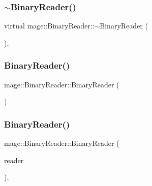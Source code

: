 \subsubsection{\texorpdfstring{$\sim$\+Binary\+Reader()}{~BinaryReader()}}
{\footnotesize\ttfamily virtual mage\+::\+Binary\+Reader\+::$\sim$\+Binary\+Reader (\begin{DoxyParamCaption}{ }\end{DoxyParamCaption})\hspace{0.3cm}{\ttfamily [virtual]}, {\ttfamily [default]}}

\hypertarget{classmage_1_1_binary_reader_aab82579cef4f2f022273cf1adfcc8497}{}\label{classmage_1_1_binary_reader_aab82579cef4f2f022273cf1adfcc8497} 
\subsubsection{\texorpdfstring{Binary\+Reader()}{BinaryReader()}\hspace{0.1cm}{\footnotesize\ttfamily [1/3]}}
{\footnotesize\ttfamily mage\+::\+Binary\+Reader\+::\+Binary\+Reader (\begin{DoxyParamCaption}{ }\end{DoxyParamCaption})\hspace{0.3cm}{\ttfamily [protected]}}

\hypertarget{classmage_1_1_binary_reader_a8c1ff948f1d056439f3d8cc37d7f507c}{}\label{classmage_1_1_binary_reader_a8c1ff948f1d056439f3d8cc37d7f507c} 
\subsubsection{\texorpdfstring{Binary\+Reader()}{BinaryReader()}\hspace{0.1cm}{\footnotesize\ttfamily [2/3]}}
{\footnotesize\ttfamily mage\+::\+Binary\+Reader\+::\+Binary\+Reader (\begin{DoxyParamCaption}\item[{const \hyperlink{classmage_1_1_binary_reader}{Binary\+Reader} \&}]{reader }\end{DoxyParamCaption})\hspace{0.3cm}{\ttfamily [private]}, {\ttfamily [delete]}}

